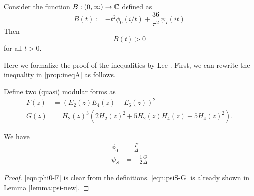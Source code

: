 \begin{proposition}\label{prop:ineqB}\leanok
Consider the function $B:(0,\infty)\to\mathbb{C}$ defined as
\begin{equation}\label{eqn:defB}
    B(t) := -t^2\phi_0(i/t)+\frac{36}{\pi^2}\,\psi_I(it)
\end{equation}
Then
\begin{equation}\label{eqn:ineqB}
    B(t) > 0
\end{equation}
for all $t > 0$.
\end{proposition}

Here we formalize the proof of the inequalities by Lee \cite{Lee}.
First, we can rewrite the inequality in \ref{prop:ineqA} as follows.

\begin{definition}\label{def:FG-definition}\leanok
Define two (quasi) modular forms as
\begin{align}
    F(z) &= (E_2(z) E_4(z) - E_6(z))^2 \label{eqn:defF} \\
    G(z) &= H_2(z)^{3} (2 H_{2}(z)^{2} + 5 H_{2}(z) H_{4}(z) + 5 H_{4}(z)^{2}). \label{eqn:defG}
\end{align}
\end{definition}

\begin{lemma}\label{lemma:F-G-phi-psi-identities}\leanok
We have
\begin{align}
    \phi_0 &= \frac{F}{\Delta} \label{eqn:phi0-F} \\
    \psi_S &= -\frac{1}{2} \frac{G}{\Delta}\label{eqn:psiS-G}
\end{align}
\end{lemma}
\begin{proof}\leanok
\eqref{eqn:phi0-F} is clear from the definitions.
\eqref{eqn:psiS-G} is already shown in Lemma \ref{lemma:psi-new}.
\end{proof}

